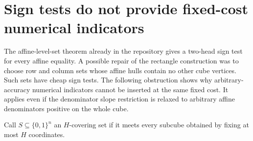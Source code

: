 \documentclass[11pt]{article}
\begin{document}
\section{Sign tests do not provide fixed-cost numerical indicators}

The affine-level-set theorem already in the repository gives a
two-head sign test for every affine equality. A possible repair of
the rectangle construction was to choose row and column sets whose
affine hulls contain no other cube vertices. Such sets have cheap
sign tests. The following obstruction shows why arbitrary-accuracy
numerical indicators cannot be inserted at the same fixed cost.
It applies even if the denominator slope restriction is relaxed to
arbitrary affine denominators positive on the whole cube.

Call $S\subseteq\{0,1\}^n$ an $H$-covering set if it meets every
subcube obtained by fixing at most $H$ coordinates.
\end{document}
